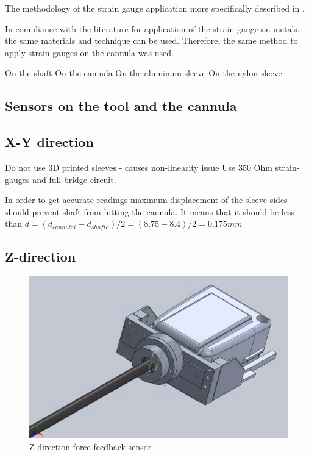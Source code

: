 	The methodology of the strain gauge application more specifically described in \cite{StrGugeInst}.

	In compliance with the literature \cite{StrGugeInst} for application of the strain gauge on metals, the same materials and technique can be used. Therefore, the same method to apply strain gauges on the cannula was used.

	On the shaft
	On the cannula
	On the aluminum sleeve
	On the nylon sleeve

\subsection{Sensors on the tool and the cannula}
\label{sec:senOnToolCan}


\subsection{X-Y direction}
\label{sec:xyDir}
Do not use 3D printed sleeves - causes non-linearity issue
Use 350 Ohm strain-gauges and full-bridge circuit.

In order to get accurate readings maximum displacement of the sleeve sides should prevent shaft from hitting the cannula. It means that it should be less than $d=(d_{cannula i} - d_{shaft o})/2 = (8.75 - 8.4)/2 = 0.175 mm$
	
\subsection{Z-direction}
\label{sec:zDir}
\begin{figure}
	\begin{center}
		\includegraphics[width=120mm]{fig/methods/z_dir.png}
	\end{center}
	\vspace{-4mm}
	\caption[Z-direction force feedback sensor]
	{Z-direction force feedback sensor}
	\label{fig:Z-direction}
	\vspace{-2mm}
\end{figure}

